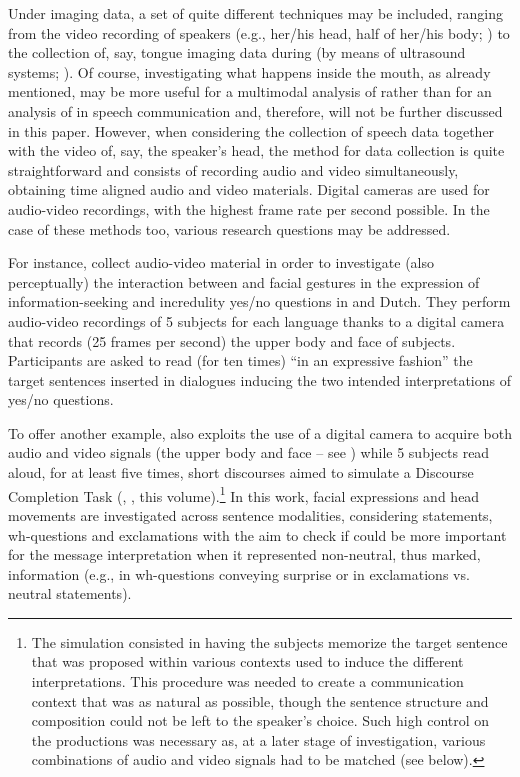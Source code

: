 \documentclass[output=paper]{langsci/langscibook}
\begin{document}
Under imaging data, a set of quite different techniques may be included, ranging from the video recording of speakers (e.g., her\slash his head, half of her\slash his body; \citealt{Ekman1978}) to the collection of, say, tongue imaging data during  (by means of ultrasound systems; \citealt{Stone2005}). Of course, investigating what happens inside the mouth, as already mentioned, may be more useful for a multimodal analysis of  rather than for an analysis of  in speech communication and, therefore, will not be further discussed in this paper. However, when considering the collection of speech data together with the video of, say, the speaker’s head, the method for data collection is quite straightforward and consists of recording audio and video simultaneously, obtaining time aligned audio and video materials. Digital cameras are used for audio-video recordings, with the highest frame rate per second possible. In the case of these methods too, various research questions may be addressed. 
 

For instance, \citet{CrespoSendra2013} collect audio-video material in order to investigate (also perceptually) the interaction between  and facial gestures in the expression of  information-seeking and incredulity yes\slash no questions in  and Dutch. They perform audio-video recordings of 5 subjects for each language thanks to a digital camera that records (25 frames per second) the upper body and face of subjects. Participants are asked to read (for ten times) “in an expressive fashion” the target sentences inserted in dialogues inducing the two intended interpretations of yes\slash no questions.

To offer another example, \citet{GiliFivela2015informazionimultimodali} also exploits the use of a digital camera to acquire both audio and video signals (the upper body and face – see ) while 5 subjects read aloud, for at least five times, short discourses aimed to simulate a {Discourse Completion Task} (\citealt{BlumKulka1989}, \citeauthor{Vanrell.2018}, this volume).\footnote{The simulation consisted in having the subjects memorize the target sentence that was proposed within various  contexts used to induce the different interpretations. This procedure was needed to create a communication context that was as natural as possible, though the sentence structure and composition could not be left to the speaker’s choice. Such high control on the productions was necessary as, at a later stage of investigation, various combinations of audio and video signals had to be matched  (see below).} In this work, facial expressions and head movements are investigated across sentence modalities, considering statements, wh-questions and exclamations with the aim to check if  could be more important for the message interpretation when it represented non-neutral, thus marked, information (e.g., in wh-questions conveying surprise or in exclamations vs. neutral statements).
\end{document}
